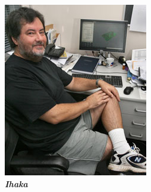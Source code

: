 \documentclass[preview]{standalone}
\begin{document}
	\begin{figure}[H]
		\centering
		\includegraphics[height=0.5\textheight]{ihaka.jpg}
		\caption*{\bfseries\itshape Ihaka}
	\end{figure}
\end{document}
